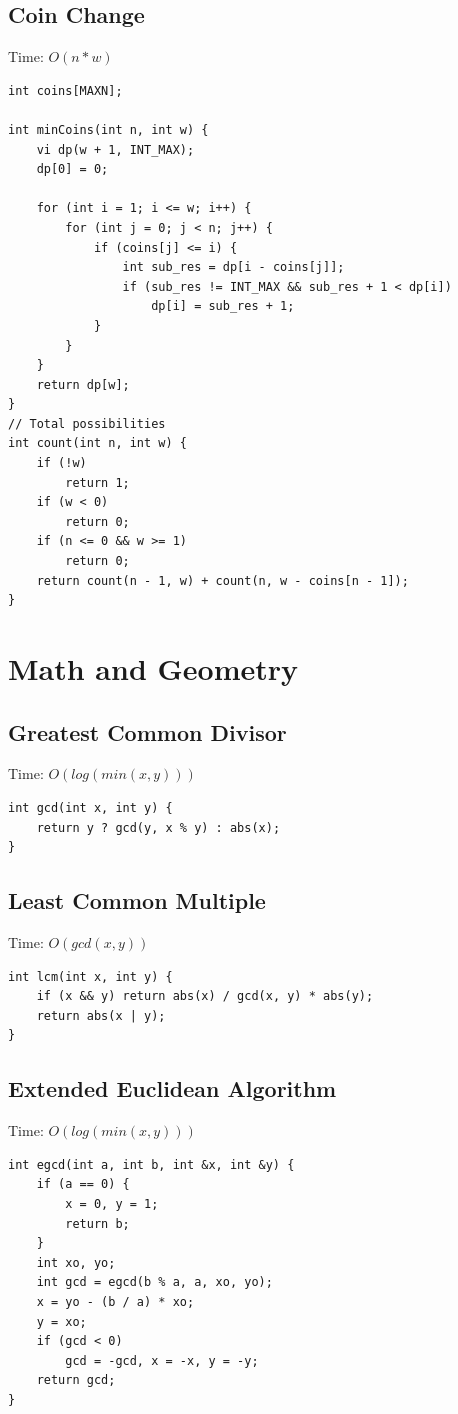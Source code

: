 \documentclass[oneside]{article}
\begin{document}
\subsection{Coin Change}
Time: $O(n * w)$
\begin{lstlisting}
int coins[MAXN];

int minCoins(int n, int w) {
    vi dp(w + 1, INT_MAX);
    dp[0] = 0;

    for (int i = 1; i <= w; i++) {
        for (int j = 0; j < n; j++) {
            if (coins[j] <= i) {
                int sub_res = dp[i - coins[j]];
                if (sub_res != INT_MAX && sub_res + 1 < dp[i])
                    dp[i] = sub_res + 1;
            }
        }
    }
    return dp[w];
}
// Total possibilities
int count(int n, int w) {
    if (!w)
        return 1;
    if (w < 0)
        return 0;        
    if (n <= 0 && w >= 1)
        return 0;
    return count(n - 1, w) + count(n, w - coins[n - 1]);
}
\end{lstlisting}

\pagebreak
\section{Math and Geometry}

\subsection{Greatest Common Divisor}
Time: $O(log(min(x, y)))$
\begin{lstlisting}
int gcd(int x, int y) {
	return y ? gcd(y, x % y) : abs(x);
}
\end{lstlisting}

\subsection{Least Common Multiple}
Time: $O(gcd(x, y))$
\begin{lstlisting}
int lcm(int x, int y) {
	if (x && y) return abs(x) / gcd(x, y) * abs(y);
	return abs(x | y);
}
\end{lstlisting}

\subsection{Extended Euclidean Algorithm}
Time: $O(log(min(x, y)))$
\begin{lstlisting}
int egcd(int a, int b, int &x, int &y) {
    if (a == 0) {
        x = 0, y = 1;
        return b;
    }
    int xo, yo;
    int gcd = egcd(b % a, a, xo, yo);
    x = yo - (b / a) * xo;
    y = xo;
    if (gcd < 0)
        gcd = -gcd, x = -x, y = -y;
    return gcd;
}
\end{lstlisting}
\end{document}

